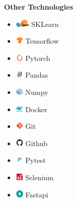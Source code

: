 \documentclass{article}
\begin{document}
\begin{multicols}{3}
\textbf{Other Technologies}
\begin{itemize}
    \item \includegraphics[height=10pt]{images/icons/sklearn.png} SKLearn
    \item \includegraphics[height=10pt]{images/icons/tensorflow-original.png} Tensorflow
    \item \includegraphics[height=10pt]{images/icons/pytorch-original.png} Pytorch
    \item \includegraphics[height=10pt]{images/icons/pandas-original.png} Pandas
    \item \includegraphics[height=10pt]{images/icons/numpy-original.png} Numpy
    \item \includegraphics[height=10pt]{images/icons/docker.png} Docker
    \item \includegraphics[height=10pt]{images/icons/git-original.png} Git
    \item \includegraphics[height=10pt]{images/icons/github-original.png} Github
    \item \includegraphics[height=10pt]{images/icons/pytest-original.png} Pytest
    \item \includegraphics[height=10pt]{images/icons/selenium-original.png} Selenium
    \item \includegraphics[height=10pt]{images/icons/fastapi-original.png} Fastapi

\end{itemize}
\end{multicols}
\end{document}
